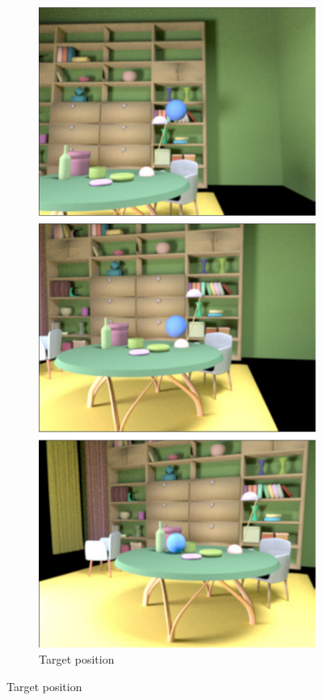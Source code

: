 \documentclass{jov}
\begin{document}
\begin{figure}
	\begin{subfigure}[b]{0.18 \textwidth}
    \centering
        \caption{Target position}
        \includegraphics[width=\textwidth]{../FiguresDraft5/Figure4/Figure4_a.pdf}

\end{subfigure}
\end{figure}
\end{document}
